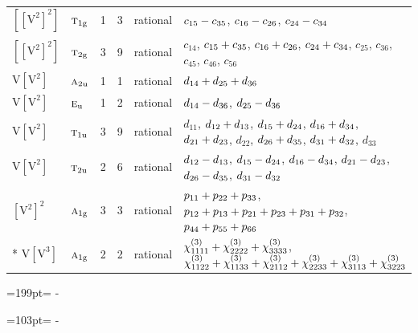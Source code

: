 \documentclass[10pt,a4paper]{article}
\newcommand{\needspace}[1]{\par\penalty-100\begingroup\dimen0=#1\relax\dimen2=\pagegoal
  \advance\dimen2-\pagetotal\ifdim\dimen0>\dimen2\relax\ifdim\dimen2>0pt\vfil\break\fi\fi
  \endgroup}
\numberwithin{equation}{section}
\newcommand{\irr}[1]{\text{\normalfont\scshape #1}}
\newcommand{\ptag}[1]{\mathrm{#1}}
\newcommand{\jahn}[1]{\mathrm{#1}}
\newlength{\fillwidth}\newlength{\cellwidth}\newlength{\colwidth}
\newcommand{\signbreak}{\penalty100\relax}
\begin{document}
{\begin{longtable}{@{}llrrl>{\RaggedRight\arraybackslash}p{\fillwidth}@{}}
$\jahn{[[V^{2}]^{2}]}$ & $\irr{t}_{1\ptag{g}}$ & 1 & 3 & rational & $c_{15} -\signbreak c_{35}$, $c_{16} -\signbreak c_{26}$, $c_{24} -\signbreak c_{34}$\\
$\jahn{[[V^{2}]^{2}]}$ & $\irr{t}_{2\ptag{g}}$ & 3 & 9 & rational & $c_{14}$, $c_{15} +\signbreak c_{35}$, $c_{16} +\signbreak c_{26}$, $c_{24} +\signbreak c_{34}$, $c_{25}$, $c_{36}$, $c_{45}$, $c_{46}$, $c_{56}$\\
$\jahn{V[V^{2}]}$ & $\irr{a}_{2\ptag{u}}$ & 1 & 1 & rational & $d_{14} +\signbreak d_{25} +\signbreak d_{36}$\\
$\jahn{V[V^{2}]}$ & $\irr{e}_{\ptag{u}}$ & 1 & 2 & rational & $d_{14} -\signbreak d_{36}$, $d_{25} -\signbreak d_{36}$\\
$\jahn{V[V^{2}]}$ & $\irr{t}_{1\ptag{u}}$ & 3 & 9 & rational & $d_{11}$, $d_{12} +\signbreak d_{13}$, $d_{15} +\signbreak d_{24}$, $d_{16} +\signbreak d_{34}$, $d_{21} +\signbreak d_{23}$, $d_{22}$, $d_{26} +\signbreak d_{35}$, $d_{31} +\signbreak d_{32}$, $d_{33}$\\
$\jahn{V[V^{2}]}$ & $\irr{t}_{2\ptag{u}}$ & 2 & 6 & rational & $d_{12} -\signbreak d_{13}$, $d_{15} -\signbreak d_{24}$, $d_{16} -\signbreak d_{34}$, $d_{21} -\signbreak d_{23}$, $d_{26} -\signbreak d_{35}$, $d_{31} -\signbreak d_{32}$\\
$\jahn{[V^{2}]^{2}}$ & $\irr{a}_{1\ptag{g}}$ & 3 & 3 & rational & $p_{11} +\signbreak p_{22} +\signbreak p_{33}$, $p_{12} +\signbreak p_{13} +\signbreak p_{21} +\signbreak p_{23} +\signbreak p_{31} +\signbreak p_{32}$, $p_{44} +\signbreak p_{55} +\signbreak p_{66}$\\*
$\jahn{V[V^{3}]}$ & $\irr{a}_{1\ptag{g}}$ & 2 & 2 & rational & $\chi^{(3)}_{1111} +\signbreak \chi^{(3)}_{2222} +\signbreak \chi^{(3)}_{3333}$, $\chi^{(3)}_{1122} +\signbreak \chi^{(3)}_{1133} +\signbreak \chi^{(3)}_{2112} +\signbreak \chi^{(3)}_{2233} +\signbreak \chi^{(3)}_{3113} +\signbreak \chi^{(3)}_{3223}$\\
\bottomrule\end{longtable}}
\needspace{199pt}
\needspace{103pt}
\end{document}
